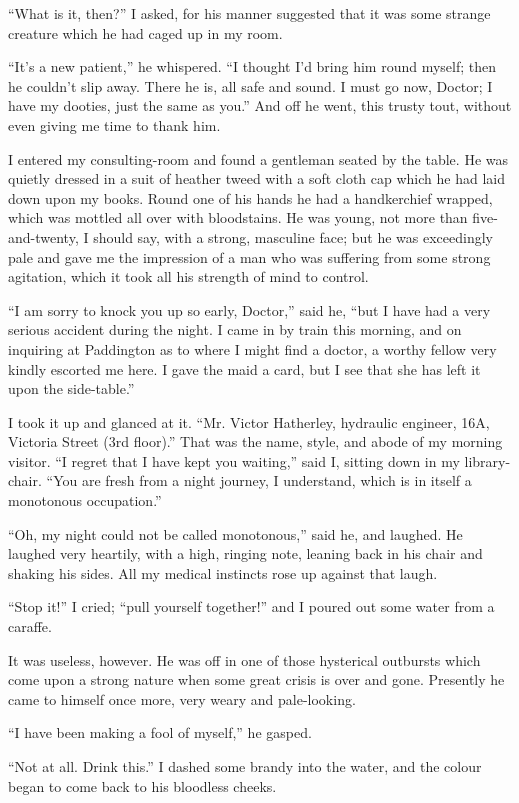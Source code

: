 \documentclass{article}
\begin{document}
``What is it, then?'' I asked, for his manner suggested that it was some
strange creature which he had caged up in my room.

``It's a new patient,'' he whispered. ``I thought I'd bring him round
myself; then he couldn't slip away. There he is, all safe and sound. I
must go now, Doctor; I have my dooties, just the same as you.'' And off
he went, this trusty tout, without even giving me time to thank him.

I entered my consulting-room and found a gentleman seated by the table. He
was quietly dressed in a suit of heather tweed with a soft cloth cap
which he had laid down upon my books. Round one of his hands he had a
handkerchief wrapped, which was mottled all over with bloodstains. He
was young, not more than five-and-twenty, I should say, with a strong,
masculine face; but he was exceedingly pale and gave me the impression
of a man who was suffering from some strong agitation, which it took
all his strength of mind to control.

``I am sorry to knock you up so early, Doctor,'' said he, ``but I have
had a very serious accident during the night. I came in by train this
morning, and on inquiring at Paddington as to where I might find a doctor,
a worthy fellow very kindly escorted me here. I gave the maid a card,
but I see that she has left it upon the side-table.''

I took it up and glanced at it. ``Mr. Victor Hatherley, hydraulic
engineer, 16A, Victoria Street (3rd floor).'' That was the name,
style, and abode of my morning visitor. ``I regret that I have kept you
waiting,'' said I, sitting down in my library-chair. ``You are fresh
from a night journey, I understand, which is in itself a monotonous
occupation.''

``Oh, my night could not be called monotonous,'' said he, and laughed. He
laughed very heartily, with a high, ringing note, leaning back in his
chair and shaking his sides. All my medical instincts rose up against
that laugh.

``Stop it!'' I cried; ``pull yourself together!'' and I poured out some
water from a caraffe.

It was useless, however. He was off in one of those hysterical outbursts
which come upon a strong nature when some great crisis is over and
gone. Presently he came to himself once more, very weary and pale-looking.

``I have been making a fool of myself,'' he gasped.

``Not at all. Drink this.'' I dashed some brandy into the water, and
the colour began to come back to his bloodless cheeks.
\end{document}
